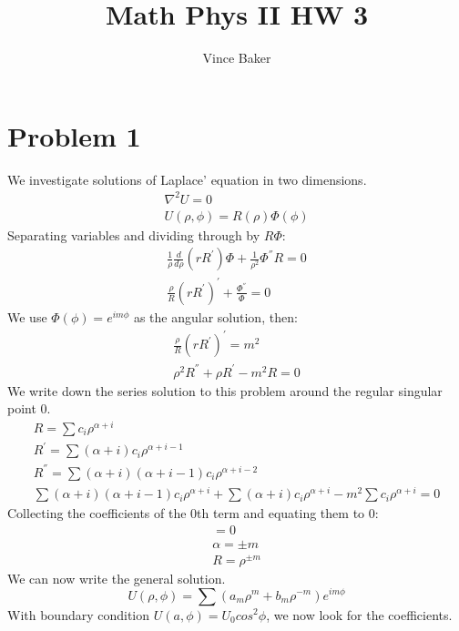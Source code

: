 \documentclass[a4paper,10pt]{article}
\title{Math Phys II HW 3}
\author{Vince Baker}
\numberwithin{equation}{section}
\begin{document}
\maketitle

\begin{abstract}

\end{abstract}

\section{Problem 1}
We investigate solutions of Laplace' equation in two dimensions.
\begin{gather}
 \nabla ^2 U = 0\\
 U(\rho, \phi)=R(\rho)\Phi(\phi)
\end{gather}
Separating variables and dividing through by $R\Phi$:
\begin{gather}
  \frac{1}{\rho}\frac{d}{d\rho}(r R^{'} )\Phi+\frac{1}{\rho^2}\Phi^{''}R=0\\
  \frac{\rho}{R}(rR^{'})^{'}+\frac{\Phi^{''}}{\Phi}=0
\end{gather}
We use $\Phi(\phi)=e^{im\phi}$ as the angular solution, then:
\begin{gather}
 \frac{\rho}{R}(rR^{'})^{'}=m^2\\
 \rho ^2R^{''}+\rho R^{'}-m^2R=0
\end{gather}
We write down the series solution to this problem around the regular singular point 0.
\begin{gather}
 R=\sum c_i \rho ^{\alpha+i}\\
 R^{'}=\sum (\alpha+i)c_i \rho ^{\alpha+i-1}\\
 R^{''}=\sum (\alpha+i)(\alpha+i-1)c_i\rho ^{\alpha+i-2}\\
 \sum (\alpha+i)(\alpha+i-1)c_i\rho ^{\alpha+i}+\sum (\alpha+i)c_i \rho ^{\alpha+i}-m^2\sum c_i \rho ^{\alpha+i}=0
\end{gather}
Collecting the coefficients of the 0th term and equating them to 0:
\begin{gather}
 [\alpha(\alpha-1)+\alpha-m^2]=0\\
 \alpha=\pm m\\
 R=\rho ^{\pm m}
\end{gather}
We can now write the general solution.
\begin{equation}
 U(\rho, \phi)=\sum (a_{m}\rho^{m}+b_m\rho^{-m})e^{im\phi}
\end{equation}
With boundary condition $U(a,\phi)=U_0cos^2\phi$, we now look for the coefficients.
\end{document}
